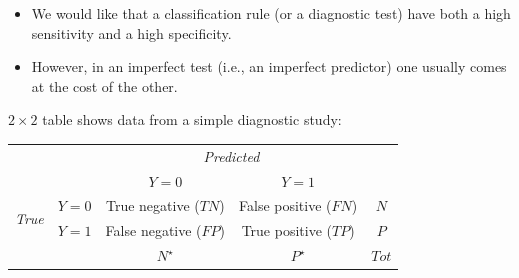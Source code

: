 \documentclass[10pt,ignorenonframetext,]{beamer}
\providecommand{\tightlist}{%
  \setlength{\itemsep}{0pt}\setlength{\parskip}{0pt}}
\begin{document}
\begin{frame}

\begin{itemize}
\tightlist
\item
  We would like that a classification rule (or a diagnostic test) have
  both a high sensitivity and a high specificity.
\item
  However, in an imperfect test (i.e., an imperfect predictor) one
  usually comes at the cost of the other.
\end{itemize}

\(2 \times 2\) table shows data from a simple diagnostic study:

\begin{center}
\begin{tabular}{ll|c|c|c}
& & \multicolumn{2}{c}{\emph{Predicted}} \\
& & $Y=0$ & $Y=1$ \\ 
\hline
\multirow{2}{*}{\emph{True}} & $Y=0$ & True negative ($TN$) & False positive ($FN$) & $N$\\
 & $Y=1$ & False negative ($FP$) & True positive ($TP$) & $P$\\
\hline
& & $N^\star$ & $P^\star$ & $Tot$ 
\end{tabular}
\end{center}

\end{frame}
\end{document}
